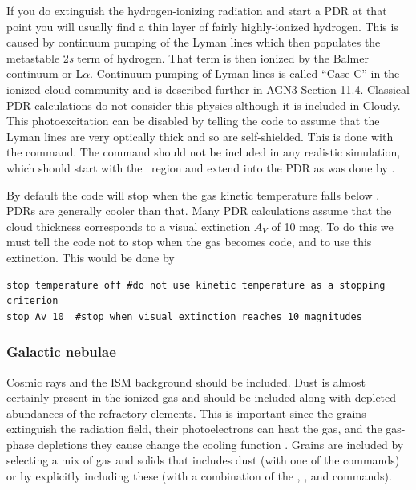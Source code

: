 \documentclass[12pt,twoside]{article}
\begin{document}
If you do extinguish the hydrogen-ionizing radiation and start a PDR
at that point you will usually find a thin layer of fairly highly-ionized
hydrogen.  This is caused by continuum pumping of the Lyman lines which
then populates the metastable 2\emph{s} term of hydrogen.
That term is then
ionized by the Balmer continuum or $\mathrm{L}\alpha$.
Continuum pumping of Lyman lines
is called ``Case C'' in the ionized-cloud community
\citep{FerlandCaseC99} and is described further in AGN3 Section 11.4.
Classical PDR calculations
do not consider this physics although it is included in Cloudy.
This photoexcitation can be disabled by telling the code
to assume that the Lyman lines are very optically thick
and so are self-shielded.
This is done with
the  command.
The  command should
not be included in any realistic simulation, which should start with the
\hplus\ region and extend into the PDR as was done by
\citet{Abel2005}.

By default the code will stop when the gas kinetic temperature 
falls below \TEMPSTOPDEFAULT.
PDRs are generally cooler than that.
Many PDR calculations assume that the cloud thickness corresponds
to a visual extinction $A_V$ of 10 mag.
To do this we must tell the code not to stop when the gas becomes
code, and to use this extinction.  This would be done by
\begin{verbatim}
stop temperature off #do not use kinetic temperature as a stopping criterion
stop Av 10  #stop when visual extinction reaches 10 magnitudes
\end{verbatim}

\subsubsection{Galactic nebulae}

Cosmic rays and the ISM background should be included.  Dust is almost
certainly present in the ionized gas and should be included along with
depleted abundances of the refractory elements.
This is important since
the grains extinguish the radiation field, their photoelectrons can heat
the gas, and the gas-phase depletions they cause change
the cooling function \citep{KingdonEtAlGrainEffects95}.
Grains are included by selecting a mix of gas and solids that
includes dust (with one of the  commands) or by explicitly
including these (with a combination of the ,
, and  commands).
\end{document}
